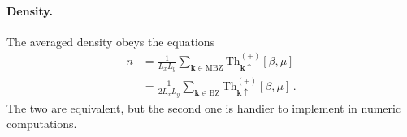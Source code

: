 \paragraph{Density.}

The averaged density obeys the equations
\begin{align}
	n &= \frac{1}{L_x L_y} \sum_{\mathbf{k} \in \mathrm{MBZ}} \mathrm{Th}_{\mathbf{k}\uparrow}^{(+)}[\beta,\mu] \label{eq:af-hm-n-MBZ-Th} \\
	&= \frac{1}{2L_x L_y} \sum_{\mathbf{k} \in \mathrm{BZ}} \mathrm{Th}_{\mathbf{k}\uparrow}^{(+)}[\beta,\mu] \, . \label{eq:af-hm-n-BZ-Th}
\end{align}
The two are equivalent, but the second one is handier to implement in numeric computations.

\begin{tabproof}
	

\end{tabproof}
